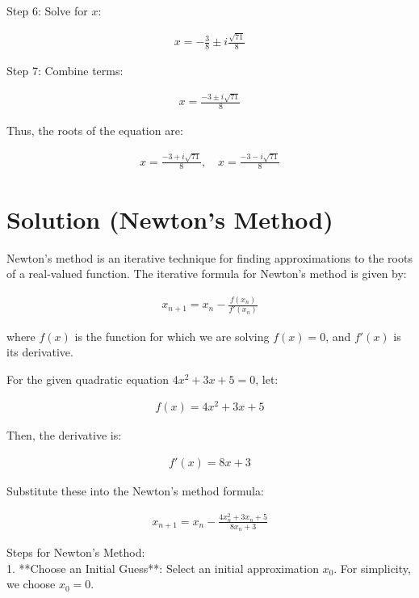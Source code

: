 \documentclass[journal]{IEEEtran}
\begin{document}
Step 6: Solve for \( x \):

\begin{align}
x = -\frac{3}{8} \pm i \frac{\sqrt{71}}{8}
\end{align}

Step 7: Combine terms:

\begin{align}
x = \frac{-3 \pm i\sqrt{71}}{8}
\end{align}

Thus, the roots of the equation are:

\begin{align}
\boxed{x = \frac{-3 + i\sqrt{71}}{8}, \quad x = \frac{-3 - i\sqrt{71}}{8}}
\end{align}

\section*{Solution (Newton's Method)}

Newton's method is an iterative technique for finding approximations to the roots of a real-valued function. The iterative formula for Newton's method is given by:

\begin{align}
x_{n+1} = x_n - \frac{f(x_n)}{f'(x_n)}
\end{align}

where \( f(x) \) is the function for which we are solving \( f(x) = 0 \), and \( f'(x) \) is its derivative.

For the given quadratic equation \( 4x^2 + 3x + 5 = 0 \), let:

\begin{align}
f(x) = 4x^2 + 3x + 5
\end{align}

Then, the derivative is:

\begin{align}
f'(x) = 8x + 3
\end{align}

Substitute these into the Newton's method formula:

\begin{align}
x_{n+1} = x_n - \frac{4x_n^2 + 3x_n + 5}{8x_n + 3}
\end{align}

 Steps for Newton's Method:\\

1. **Choose an Initial Guess**: Select an initial approximation \( x_0 \). For simplicity, we choose \( x_0 = 0 \).\\
\end{document}
